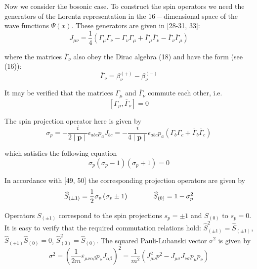 \documentclass[a4paper,12pt]{article}
\begin{document}
Now we consider the bosonic case. To construct the spin operators we need
the generators of the Lorentz representation in the $16-$dimensional space
of the wave functions $\Psi (x)$. These generators are given in [28-31, 33]:
\begin{equation}
J_{\mu \nu }=\frac 14\left( \Gamma _\mu \Gamma _\nu -\Gamma _\nu \Gamma _\mu
+\overline{\Gamma }_\mu \overline{\Gamma }_\nu -\overline{\Gamma }_\nu
\overline{\Gamma }_\mu \right)  \label{23}
\end{equation}

where the matrices $\overline{\Gamma }_\nu $ also obey the Dirac algebra
(18) and have the form (see (16)):
\begin{equation}
\overline{\Gamma }_\nu =\beta _\nu ^{(+)}-\beta _\nu ^{(-)}  \label{24}
\end{equation}

It may be verified that the matrices $\Gamma _\mu $ and
$\overline{\Gamma } _\nu $ commute each other, i.e.
\begin{equation}
\left[ \Gamma _\mu ,\overline{\Gamma }_\nu \right] =0  \label{25}
\end{equation}

The spin projection operator here is given by
\begin{equation}
\sigma _p=-\frac i{2\mid \mathbf{p}\mid }\epsilon _{abc}p_aJ_{bc}=-\frac
i{4\mid \mathbf{p}\mid }\epsilon _{abc}p_a\left( \Gamma _b\Gamma _c+%
\overline{\Gamma }_b\overline{\Gamma }_c\right)  \label{26}
\end{equation}

which satisfies the following equation
\begin{equation}
\sigma _p\left( \sigma _p-1\right) \left( \sigma _p+1\right) =0  \label{27}
\end{equation}

In accordance with [49, 50] the corresponding projection operators are given
by
\begin{equation}
\widehat{S}_{(\pm 1)}=\frac 12\sigma _p\left( \sigma _p\pm
1\right) \hspace{0.5in}\widehat{S}_{(0)}=1-\sigma _p^2  \label{28}
\end{equation}

Operators $S_{(\pm 1)}$ correspond to the spin projections
$s_p=\pm 1$ and $ S_{(0)}$ to $s_p=0$. It is easy to verify that
the required commutation relations hold: $\widehat{S}_{(\pm
1)}^2=\widehat{S}_{(\pm 1)}$, $\widehat{S} _{(\pm
1)}\widehat{S}_{(0)}=0$, $\widehat{S}_{(0)}^2=\widehat{S}_{(0)}$.
The squared Pauli-Lubanski vector $\sigma ^2$ is given by
\begin{equation}
\sigma ^2=\left( \frac 1{2m}\varepsilon _{\mu \nu \alpha \beta }p_\nu
J_{\alpha \beta }\right) ^2=\frac 1{m^2}\left( J_{\mu \nu }^2p^2-J_{\mu
\sigma }J_{\nu \sigma }p_\mu p_\nu \right)  \label{29}
\end{equation}
\end{document}

